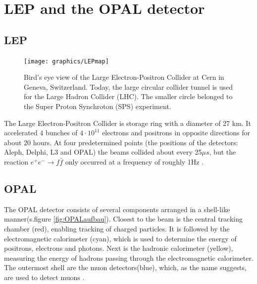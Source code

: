 \section{LEP and the OPAL detector}
\subsection{LEP}
\begin{figure}[ht]
	\centering
	\texttt{[image: graphics/LEPmap]}
	\caption[Bird's eye view LEP]{Bird's eye view of the Large Electron-Positron Collider at Cern in Geneva, Switzerland. Today, the large circular collider tunnel is used for the Large Hadron Collider (LHC)\cite{jakobs}. The smaller circle belonged to the Super Proton Synchroton (SPS) experiment.}
	\label{fig:LEPmap}
\end{figure}
The Large Electron-Positron Collider is storage ring with a diameter of 27 km. It accelerated 4 bunches of $4\cdot 10^{11}$ electrons and positrons in opposite directions for about 20 hours. At four predetermined points (the positions of the detectors: Aleph, Delphi, L3 and OPAL) the beams collided about every 25$\mu s$, but the reaction $e^+ e^- \rightarrow f \bar{f}$ only occurred at a frequency of roughly 1Hz \cite{muenchen}.

\subsection{OPAL}
The OPAL detector consists of several components arranged in a shell-like manner(s.figure \ref{fig:OPALaufbau}). Closest to the beam is the central tracking chamber (red), enabling tracking of charged particles. It is followed by the electromagnetic calorimeter (cyan), which is used to determine the energy of positrons, electrons and photons.
Next is the hadronic calorimeter (yellow), measuring the energy of hadrons passing through the electromagnetic calorimeter.
The outermost shell are the muon detectors(blue), which, as the name suggests, are used to detect muons \cite{cern}.\\

